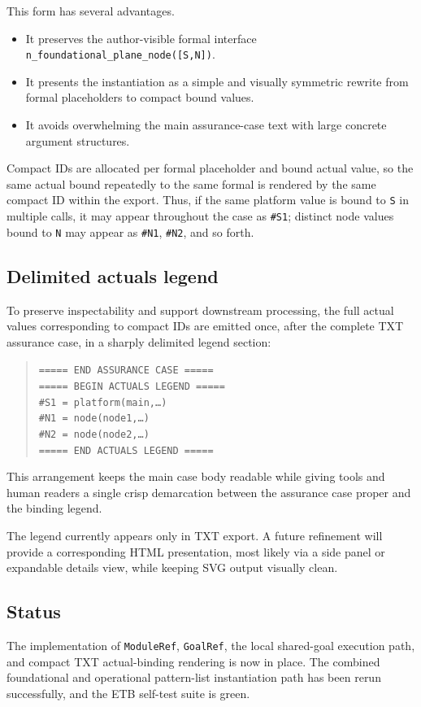 \documentclass[12pt,twoside,a4paper]{article}
\begin{document}
This form has several advantages.

\begin{itemize}
\item It preserves the author-visible formal interface
      \texttt{n\_foundational\_plane\_node([S,N])}.
\item It presents the instantiation as a simple and visually symmetric rewrite
      from formal placeholders to compact bound values.
\item It avoids overwhelming the main assurance-case text with large concrete
      argument structures.
\end{itemize}

Compact IDs are allocated per formal placeholder and bound actual value, so
the same actual bound repeatedly to the same formal is rendered by the same
compact ID within the export. Thus, if the same platform value is bound to
\texttt{S} in multiple calls, it may appear throughout the case as
\texttt{\#S1}; distinct node values bound to \texttt{N} may appear as
\texttt{\#N1}, \texttt{\#N2}, and so forth.

\subsection{Delimited actuals legend}

To preserve inspectability and support downstream processing, the full actual
values corresponding to compact IDs are emitted once, after the complete TXT
assurance case, in a sharply delimited legend section:

\begin{quote}
\texttt{===== END ASSURANCE CASE =====}\\
\texttt{===== BEGIN ACTUALS LEGEND =====}\\
\texttt{\#S1 = platform(main,\ldots)}\\
\texttt{\#N1 = node(node1,\ldots)}\\
\texttt{\#N2 = node(node2,\ldots)}\\
\texttt{===== END ACTUALS LEGEND =====}
\end{quote}

This arrangement keeps the main case body readable while giving tools and human
readers a single crisp demarcation between the assurance case proper and the
binding legend.

The legend currently appears only in TXT export. A future refinement will
provide a corresponding HTML presentation, most likely via a side panel or
expandable details view, while keeping SVG output visually clean.

\subsection{Status}

The implementation of \texttt{ModuleRef}, \texttt{GoalRef}, the local
shared-goal execution path, and compact TXT actual-binding rendering is now in
place. The combined foundational and operational pattern-list instantiation
path has been rerun successfully, and the ETB self-test suite is green.
\end{document}
